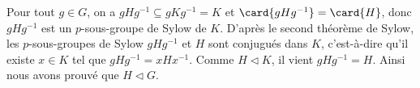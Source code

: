 Pour tout $g\in G$, on a $gHg^{-1}\subseteq gKg^{-1}=K$ et
$\card{gHg^{-1}}=\card{H}$, donc $gHg^{-1}$ est un $p$-sous-groupe de Sylow de
$K$. D'après le second théorème de Sylow, les $p$-sous-groupes de Sylow
$gHg^{-1}$ et $H$ sont conjugués dans $K$, c'est-à-dire qu'il existe $x\in K$
tel que $gHg^{-1}=xHx^{-1}$. Comme $H\lhd K$, il vient $gHg^{-1}=H$. Ainsi nous
avons prouvé que $H\lhd G$.
